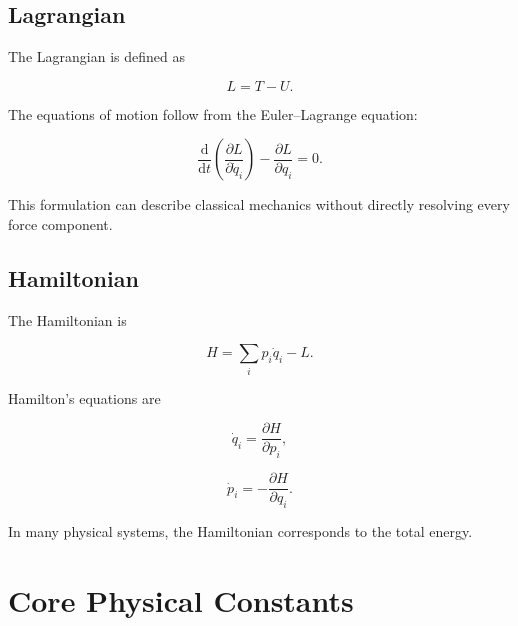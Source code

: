\documentclass[11pt,a4paper]{article}
\newcommand{\dd}{\mathrm{d}}
\begin{document}
\subsection{Lagrangian}

The Lagrangian is defined as

\[
L=T-U.
\]

The equations of motion follow from the Euler--Lagrange equation:

\[
\frac{\dd}{\dd t}
\left(
\frac{\partial L}{\partial\dot q_i}
\right)
-
\frac{\partial L}{\partial q_i}
=0.
\]

This formulation can describe classical mechanics without directly resolving every force component.

\subsection{Hamiltonian}

The Hamiltonian is

\[
H=\sum_i p_i\dot q_i-L.
\]

Hamilton's equations are

\[
\dot q_i=\frac{\partial H}{\partial p_i},
\]

\[
\dot p_i=-\frac{\partial H}{\partial q_i}.
\]

In many physical systems, the Hamiltonian corresponds to the total energy.

\section{Core Physical Constants}
\end{document}
